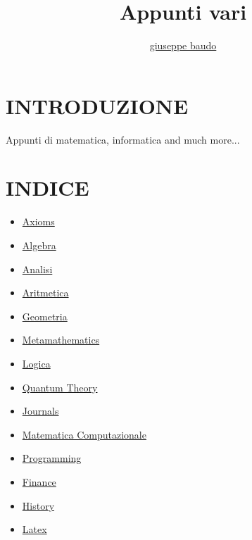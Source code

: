 \documentclass[a4paper,10pt]{article}
\title{Appunti vari}
\author{\href{http://www.baudo.hol.es}{giuseppe baudo}}
\begin{document}
\maketitle

\section{INTRODUZIONE}
Appunti di matematica, informatica and much more...

\section{INDICE}
\begin{itemize}
  \item \href{./Axioms.html}{Axioms}
  \item \href{./AlgebraIndex.html}{Algebra}
  \item \href{./Analisi.html}{Analisi} 
  \item \href{./Aritmetica.html}{Aritmetica}
  \item \href{./Geometria.html}{Geometria}
  \item \href{./Metamathematics.html}{Metamathematics}
  \item \href{./Logics.html}{Logica}
  \item \href{./QuantumTheory.html}{Quantum Theory}
  \item \href{./Journals.html}{Journals}
  \item \href{./MatematicaComputazionale.html}{Matematica Computazionale}
  \item \href{./Programming.html}{Programming}
  \item \href{./finance.html}{Finance} 
  \item \href{./history.html}{History} 
  \item \href{./latex.html}{Latex} 
  
\end{itemize}
\end{document}
